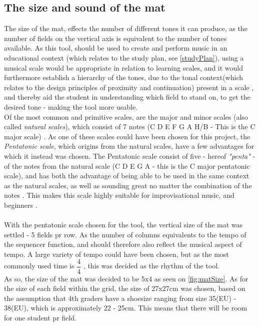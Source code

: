 \subsection{The size and sound of the mat } \label{sizeSoundColorMat}
The size of the mat, effects the number of different tones it can produce, as the number of fields on the vertical axis is equivalent to the number of tones available. As this tool, should be used to create and perform music in an educational context (which relates to the study plan, see \autoref{studyPlan}), using a musical scale would be appropriate in relation to learning scales, and it would furthermore establish a hierarchy of the tones, due to the tonal context(which relates to the design principles\cite{gestalt} of proximity and continuation) present in a scale \cite{cognitiveFoundationOfPitch}, and thereby aid the student in understanding which field to stand on, to get the desired tone - making the tool more usable.  \\
Of the most common and primitive scales, are the major and minor scales (also called \textit{natural scales}), which consist of 7 notes (C D E F G A H/B - This is the C major scale) \cite{scales}. As one of these scales could have been chosen for this project, the \textit{Pentatonic scale}, which origins from the natural scales, have a few advantages for which it instead was chosen. The Pentatonic scale consist of five - hereof \textit{"penta"} - of the notes from the natural scale (C D E G A - this is the C major pentatonic scale), and has both the advantage of being able to be used in the same context as the natural scales, as well as sounding great no matter the combination of the notes \cite{pentatonicScale}. This makes this scale highly suitable for improvisational music, and beginners \cite{pentatonicScale}.  \\\\ 

With the pentatonic scale chosen for the tool, the vertical size of the mat was settled - 5 fields pr row. As the number of columns equivalents to the tempo of the sequencer function, and should therefore also reflect the musical aspect of tempo. A large variety of tempo could have been chosen, but as the most commonly used time is $\dfrac{4}{4} $ \cite{tempo}, this was decided as the rhythm of the tool. \\ As so, the size of the mat was decided to be 5x4 as seen on \autoref{fig:matSize}. As for the size of each field within the grid, the size of 27x27cm was chosen, based on the assumption that 4th graders have a shoesize ranging from size 35(EU) - 38(EU), which is approximately 22 - 25cm. This means that there will be room for one student pr field.       


